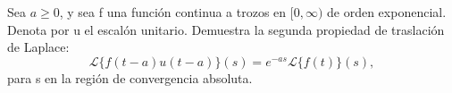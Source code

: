 Sea \(a\ge0\), y sea f una función continua a trozos en \([0,\infty)\) de orden exponencial. Denota por u el escalón unitario. Demuestra la segunda propiedad de traslación de Laplace:
\[\mathcal L\{f(t-a)u(t-a)\}(s)=e^{-as}\mathcal L\{f(t)\}(s),\]
para s en la región de convergencia absoluta.
